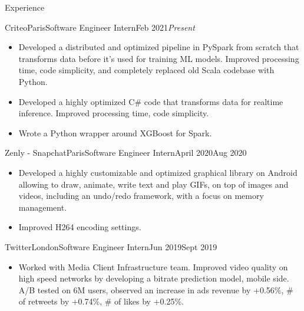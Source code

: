 \documentclass{resume}
\begin{document}
	\begin{rSection}{Experience}
        \begin{job}{Criteo}{Paris}{Software Engineer Intern}{Feb 2021}{\em{Present}}{
            \begin{itemize}
                \item Developed a distributed and optimized pipeline in PySpark from scratch that transforms data before it's used for training ML models. Improved processing time, code simplicity, and completely replaced old Scala codebase with Python.
                \item Developed a highly optimized C\# code that transforms data for realtime inference. Improved processing time, code simplicity.
                \item Wrote a Python wrapper around XGBoost for Spark.
            \end{itemize}
        }
        \end{job}

        \begin{job}{Zenly - Snapchat}{Paris}{Software Engineer Intern}{April 2020}{Aug 2020}{
            \begin{itemize}
                \item Developed a highly customizable and optimized graphical library on Android allowing to draw, animate, write text and play GIFs, on top of images and videos, including an undo/redo framework, with a focus on memory management.
                \item Improved H264 encoding settings.
            \end{itemize}
        }
        \end{job}

        \begin{job}{Twitter}{London}{Software Engineer Intern}{Jun 2019}{Sept 2019}{
            \begin{itemize}
                \item Worked with Media Client Infrastructure team. Improved video quality on high speed networks by developing a bitrate prediction model, mobile side. A/B tested on 6M users, observed an increase in ads revenue by +0.56\%, \# of retweets by +0.74\%, \# of likes by +0.25\%.
            \end{itemize}
        }
        \end{job}


\end{rSection}
\end{document}
